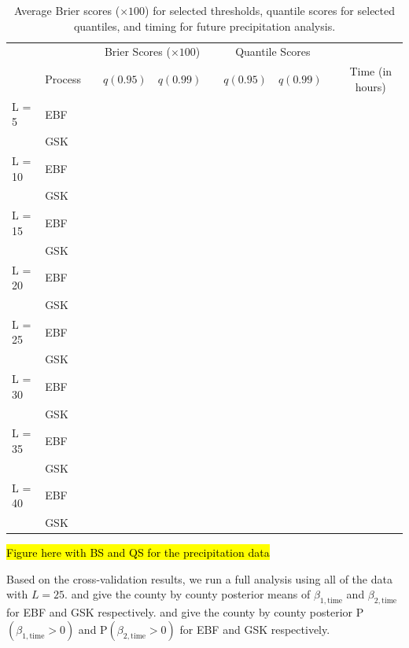 \documentclass[11pt]{article}
\begin{document}
\begin{table}[htbp]
\caption{Average Brier scores ($\times 100$) for selected thresholds, quantile scores for selected quantiles, and timing for future precipitation analysis.}
\label{ebtbl:firescores}
\centering
  \begin{tabular}{llcrrcrrcc}
  \toprule
  & & \phantom{ab} & \multicolumn{2}{c}{Brier Scores ($\times 100$)} & \phantom{abc} & \multicolumn{2}{c}{Quantile Scores} & \phantom{ab} & \\
  \cmidrule{4-5} \cmidrule{7-8}
  & Process && $q(0.95)$ & $q(0.99)$ && $q(0.95)$ & $q(0.99)$ && Time (in hours)\\
  \midrule
  L = 5  & EBF &&  &  &&  &  && \\
         & GSK &&  &  &&  &  && \\
  \midrule
  L = 10 & EBF &&  &  &&  &  && \\
         & GSK &&  &  &&  &  && \\
  \midrule
  L = 15 & EBF &&  &  &&  &  && \\
         & GSK &&  &  &&  &  && \\
  \midrule
  L = 20 & EBF &&  &  &&  &  && \\
         & GSK &&  &  &&  &  && \\
  \midrule
  L = 25 & EBF &&  &  &&  &  && \\
         & GSK &&  &  &&  &  && \\
  \midrule
  L = 30 & EBF &&  &  &&  &  && \\
         & GSK &&  &  &&  &  && \\
  \midrule
  L = 35 & EBF &&  &  &&  &  && \\
         & GSK &&  &  &&  &  && \\
  \midrule
  L = 40 & EBF &&  &  &&  &  && \\
         & GSK &&  &  &&  &  && \\
  \bottomrule
  \end{tabular}
\end{table}

\hl{Figure here with BS and QS for the precipitation data}

Based on the cross-validation results, we run a full analysis using all of the data with $L = 25$.
 and  give the county by county posterior means of $\beta_{1, \text{time}}$ and $\beta_{2, \text{time}}$ for EBF and GSK respectively.
 and  give the county by county posterior P$(\beta_{1, \text{time}} > 0)$ and P$(\beta_{2, \text{time}} > 0)$ for EBF and GSK respectively.
\end{document}
